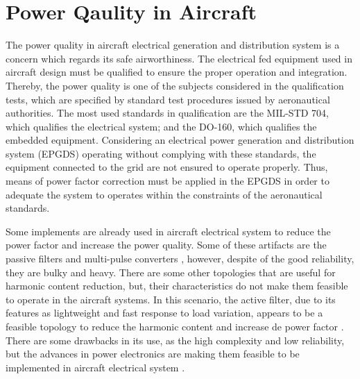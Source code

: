 \section{Power Qaulity in Aircraft}

The power quality in aircraft electrical generation and distribution system is a concern which regards its safe airworthiness. The electrical fed equipment used in aircraft design must be qualified to ensure the proper operation and integration. Thereby, the power quality is one of the subjects considered in the qualification tests, which are specified by standard test procedures issued by aeronautical authorities. The most used standards in qualification are the MIL-STD 704, which qualifies the electrical system; and the DO-160, which qualifies the embedded equipment. Considering an electrical power generation and distribution system (EPGDS) operating without complying with these standards, the equipment connected to the grid are not ensured to operate properly. Thus, means of power factor correction must be applied in the EPGDS in order to adequate the system to operates within the constraints of the aeronautical standards.

Some implements are already used in aircraft electrical system to reduce the power factor and increase the power quality. Some of these artifacts are the passive filters and multi-pulse converters \cite{passive} \cite{Gong2003,Lobo2005}, however, despite of the good reliability, they are bulky and heavy. There are some other topologies that are useful for harmonic content reduction, but, their characteristics do not make them feasible to operate in the aircraft systems. In this scenario, the active filter, due to its features as lightweight and fast response to load variation, appears to be a feasible topology to reduce the harmonic content and increase de power factor \cite{Zhu2014,Chen2012control,Karatzaferis2013}. There are some drawbacks in its use, as the high complexity and low reliability, but the advances in power electronics are making them feasible to be implemented in aircraft electrical system \cite{Abdelhafez2009}.

